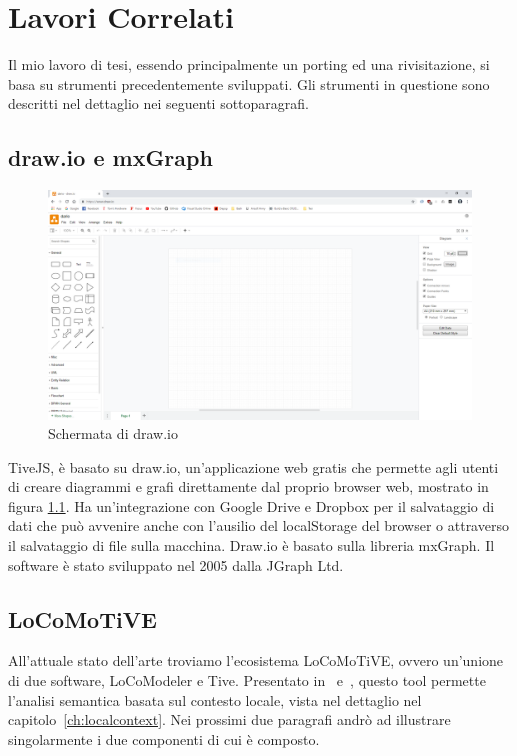 \chapter{Lavori Correlati}
    Il mio lavoro di tesi, essendo principalmente un porting ed una rivisitazione, si basa su strumenti precedentemente sviluppati.
    Gli strumenti in questione sono descritti nel dettaglio nei seguenti sottoparagrafi.

    \section{draw.io e mxGraph}

    \begin{figure}[htbp]
        \centering
        \includegraphics[scale=0.17]{Figure/drawio.png}
        \caption{Schermata di draw.io}
        \label{fig:drawio}
    \end{figure}

        TiveJS, è basato su draw.io, un'applicazione web gratis che permette agli utenti di creare diagrammi e grafi direttamente dal proprio browser web, mostrato in figura \ref{fig:drawio}. Ha un'integrazione con Google Drive e Dropbox per il salvataggio di dati che può avvenire anche con l'ausilio del localStorage del browser o attraverso il salvataggio di file sulla macchina. Draw.io è basato sulla libreria mxGraph.
        \newline
        Il software è stato sviluppato nel 2005 dalla JGraph Ltd.

    \section{LoCoMoTiVE}
        
        All'attuale stato dell'arte troviamo l'ecosistema LoCoMoTiVE, ovvero un'unione di due software, LoCoModeler e Tive. Presentato in~\cite{extending_localcontext} e~\cite{localcontext}, questo tool permette l'analisi semantica basata sul contesto locale, vista nel dettaglio nel capitolo~\ref{ch:localcontext}. Nei prossimi due paragrafi andrò ad illustrare singolarmente i due componenti di cui è composto.

